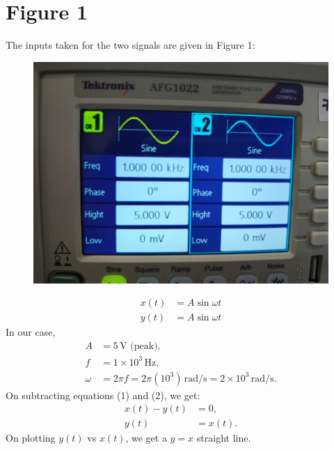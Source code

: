 \documentclass[a4paper,12pt]{article}
\numberwithin{equation}{section} %
\begin{document}
\section{Figure 1}
The inputs taken for the two signals are given in Figure 1:
\begin{figure}[h!]
    \centering
    \includegraphics[width=0.5\linewidth]{Tables/Table1.jpeg} 
    \caption{}
\end{figure}
\begin{align}
    x(t) &= A \sin \omega t \\
    y(t) &= A \sin \omega t 
\end{align}
In our case,
\begin{align}
    A &= 5 \, \text{V (peak)}, \\
    f &= 1 \times 10^3 \, \text{Hz}, \\
    \omega &= 2 \pi f = 2 \pi (10^3) \, \text{rad/s} = 2 \times 10^3 \, \text{rad/s}.
\end{align}
On subtracting equations (1) and (2), we get:
\begin{align}
    x(t) - y(t) &= 0, \\
    y(t) &= x(t).
\end{align}
On plotting $y(t)$ vs $x(t)$, we get a $y = x$ straight line.\\
\end{document}
